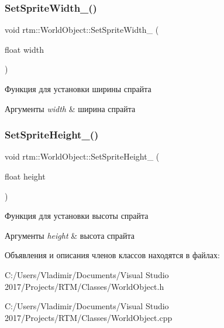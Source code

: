 \subsubsection{\texorpdfstring{Set\+Sprite\+Width\+\_\+()}{SetSpriteWidth\_()}}
{\footnotesize\ttfamily void rtm\+::\+World\+Object\+::\+Set\+Sprite\+Width\+\_\+ (\begin{DoxyParamCaption}\item[{float}]{width }\end{DoxyParamCaption})\hspace{0.3cm}{\ttfamily [private]}}

Функция для установки ширины спрайта 
\begin{DoxyParams}{Аргументы}
{\em width} & ширина спрайта \\
\hline
\end{DoxyParams}
\mbox{\label{classrtm_1_1_world_object_a553abd97f4f63659282f1e903dfc074b}} 
\subsubsection{\texorpdfstring{Set\+Sprite\+Height\+\_\+()}{SetSpriteHeight\_()}}
{\footnotesize\ttfamily void rtm\+::\+World\+Object\+::\+Set\+Sprite\+Height\+\_\+ (\begin{DoxyParamCaption}\item[{float}]{height }\end{DoxyParamCaption})\hspace{0.3cm}{\ttfamily [private]}}

Функция для установки высоты спрайта 
\begin{DoxyParams}{Аргументы}
{\em height} & высота спрайта \\
\hline
\end{DoxyParams}


Объявления и описания членов классов находятся в файлах\+:\begin{DoxyCompactItemize}
\item 
C\+:/\+Users/\+Vladimir/\+Documents/\+Visual Studio 2017/\+Projects/\+R\+T\+M/\+Classes/World\+Object.\+h\item 
C\+:/\+Users/\+Vladimir/\+Documents/\+Visual Studio 2017/\+Projects/\+R\+T\+M/\+Classes/World\+Object.\+cpp\end{DoxyCompactItemize}
